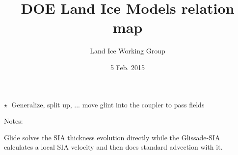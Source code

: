 \documentclass[landscape]{article}
\title{\vspace{-2em}DOE Land Ice Models relation map}
\author{Land Ice Working Group}
\date{5 Feb. 2015}
\begin{document}
    \maketitle
    
    \begin{figure}[h!]
        \centering
        \begin{tikzpicture}[scale=2]
            
        \end{tikzpicture}
    \end{figure}

    \vspace{3em}
    $\star \;$ Generalize, split up, ... move glint into the coupler to pass fields

    \vspace{1em}
    Notes:
    
    \vspace{.5em}
    Glide solves the SIA thickness evolution directly while the Glissade-SIA 
    calculates a local SIA velocity and then does standard advection with it.
\end{document}
